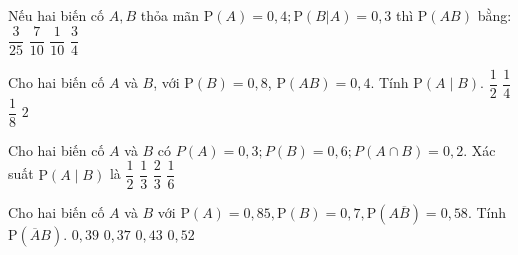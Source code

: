 \begin{ex}%
	Nếu hai biến cố $A,B$  thỏa mãn $\mathrm{P}\left(A\right)=0{,}4;\mathrm{P}\left(B|A\right)=0{,}3$ thì $\mathrm{P}\left(AB\right)$ bằng:
	\choice 
		{\True  $\dfrac{3}{25}$}
		{$\dfrac{7}{10}$} 
		{$\dfrac{1}{10}$} 
		 {$\dfrac{3}{4}$}
\end{ex}

\begin{ex}%
	Cho hai biến cố $A$ và $B$, với $\mathrm{P}\left(B\right)=0{,}8$, $\mathrm{P}\left(AB\right)=0{,}4$. Tính $\mathrm{P}\left(A\mid  B\right)$.
	\choice 
		{\True $\dfrac{1}{2}$} 
		 {$\dfrac{1}{4}$}
		 {$\dfrac{1}{8}$}
		 {$2$}
\end{ex}

\begin{ex}%
	Cho hai biến  cố $A$ và $B$ có $P(A)=0{,}3;P(B)=0{,}6;P(A\cap B)=0{,}2$. Xác suất $\mathrm{P}\left(A\mid B\right)$ là
	 \choice
		{$\dfrac{1}{2}$} 
		{\True  $\dfrac{1}{3}$}
		{$\dfrac{2}{3}$} 
		 {$\dfrac{1}{6}$}
\end{ex}

\begin{ex}%
	 Cho hai biến cố $A$ và $B$ với $\mathrm{P}\left(A\right)=0{,}85,\mathrm{P}\left(B\right)=0{,}7,\mathrm{P}\left(A\overline{B}\right)=0{,}58$. Tính $\mathrm{P}\left(\overline{A}B\right)$.
	 \choice
		 {$0{,}39$}
		 {$0{,}37$}
		{\True $0{,}43$} 
		{$0{,}52$} 
\end{ex}

